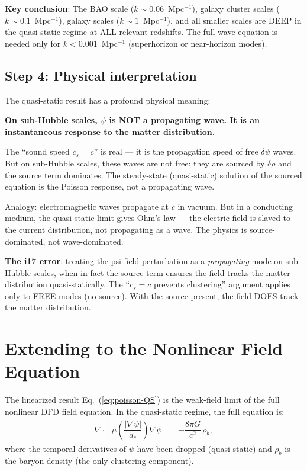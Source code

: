 \documentclass[11pt]{article}
\newcommand{\dpsi}{\delta\psi}
\newcommand{\astar}{a_*}
\begin{document}
\textbf{Key conclusion}: The BAO scale ($k \sim 0.06$~Mpc$^{-1}$),
galaxy cluster scales ($k \sim 0.1$~Mpc$^{-1}$), galaxy scales
($k \sim 1$~Mpc$^{-1}$), and all smaller scales are DEEP in the
quasi-static regime at ALL relevant redshifts. The full wave equation
is needed only for $k < 0.001$~Mpc$^{-1}$ (superhorizon or near-horizon
modes).

\subsection{Step 4: Physical interpretation}

The quasi-static result has a profound physical meaning:

\textbf{On sub-Hubble scales, $\psi$ is NOT a propagating wave.
It is an instantaneous response to the matter distribution.}

The ``sound speed $c_s = c$'' is real --- it is the propagation speed
of free $\dpsi$ waves. But on sub-Hubble scales, these waves are
not free: they are sourced by $\delta\rho$ and the source term
dominates. The steady-state (quasi-static) solution of the sourced
equation is the Poisson response, not a propagating wave.

Analogy: electromagnetic waves propagate at $c$ in vacuum. But in
a conducting medium, the quasi-static limit gives Ohm's law ---
the electric field is slaved to the current distribution, not
propagating as a wave. The physics is source-dominated, not
wave-dominated.

\textbf{The i17 error}: treating the psi-field perturbation as a
\emph{propagating} mode on sub-Hubble scales, when in fact the
source term ensures the field tracks the matter distribution
quasi-statically. The ``$c_s = c$ prevents clustering'' argument
applies only to FREE modes (no source). With the source present,
the field DOES track the matter distribution.


\section{Extending to the Nonlinear Field Equation}

The linearized result Eq.~(\ref{eq:poisson-QS}) is the weak-field limit
of the full nonlinear DFD field equation. In the quasi-static regime,
the full equation is:
\begin{equation}
\boxed{
\nabla\cdot\left[\mu\!\left(\frac{|\nabla\psi|}{\astar}\right)
\nabla\psi\right] = -\frac{8\pi G}{c^2}\,\rho_b,
}
\label{eq:full-poisson}
\end{equation}
where the temporal derivatives of $\psi$ have been dropped (quasi-static)
and $\rho_b$ is the baryon density (the only clustering component).
\end{document}
